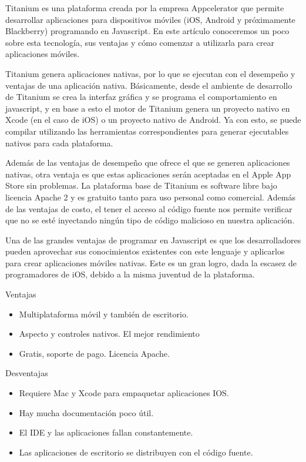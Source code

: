 Titanium es una plataforma creada por la empresa Appcelerator que permite desarrollar aplicaciones para dispositivos móviles (iOS, Android y próximamente Blackberry) programando en Javascript. En este artículo conoceremos un poco sobre esta tecnología, sus ventajas y cómo comenzar a utilizarla para crear aplicaciones móviles.

Titanium genera aplicaciones nativas, por lo que se ejecutan con el desempeño y ventajas de una aplicación nativa. Básicamente, desde el ambiente de desarrollo de Titanium se crea la interfaz gráfica y se programa el comportamiento en javascript, y en base a esto el motor de Titanium genera un proyecto nativo en Xcode (en el caso de iOS) o un proyecto nativo de Android. Ya con esto, se puede compilar utilizando las herramientas correspondientes para generar ejecutables nativos para cada plataforma.

Además de las ventajas de desempeño que ofrece el que se generen aplicaciones nativas, otra ventaja es que estas aplicaciones serán aceptadas en el Apple App Store sin problemas.
La plataforma base de Titanium es software libre bajo licencia Apache 2 y es gratuito tanto para uso personal como comercial. Además de las ventajas de costo, el tener el acceso al código fuente nos permite verificar que no se esté inyectando ningún tipo de código malicioso en nuestra aplicación.

Una de las grandes ventajas de programar en Javascript es que los desarrolladores pueden aprovechar sus conocimientos existentes con este lenguaje y aplicarlos para crear aplicaciones móviles nativas. Este es un gran logro, dada la escasez de programadores de iOS, debido a la misma juventud de la plataforma.

Ventajas

\begin{itemize}

    \item Multiplataforma móvil y también de escritorio.
    
    \item Aspecto y controles nativos. El mejor rendimiento
    
    \item Gratis, soporte de pago. Licencia Apache.

\end{itemize}

Desventajas

\begin{itemize}

    \item Requiere Mac y Xcode para empaquetar aplicaciones IOS.
    
    \item Hay mucha documentación poco útil.
    
    \item El IDE y las aplicaciones fallan constantemente.
    
    \item Las aplicaciones de escritorio se distribuyen con el código fuente.

\end{itemize}


